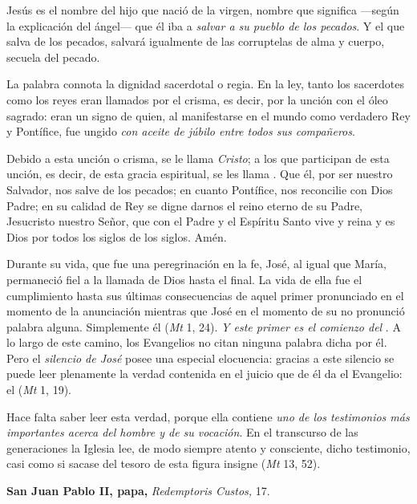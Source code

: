 \begin{body}
\begin{body}
Jesús es el nombre del hijo que nació de la virgen, nombre que significa ---según la explicación del ángel--- que él iba a \emph{salvar a su pueblo de los pecados}. Y el que salva de los pecados, salvará igualmente de las corruptelas de alma y cuerpo, secuela del pecado.

La palabra  connota la dignidad sacerdotal o regia. En la ley, tanto los sacerdotes como los reyes eran llamados  por el crisma, es decir, por la unción con el óleo sagrado: eran un signo de quien, al manifestarse en el mundo como verdadero Rey y Pontífice, fue ungido \emph{con aceite de júbilo entre todos sus compañeros}.

Debido a esta unción o crisma, se le llama \emph{Cristo}; a los que participan de esta unción, es decir, de esta gracia espiritual, se les llama . Que él, por ser nuestro Salvador, nos salve de los pecados; en cuanto Pontífice, nos reconcilie con Dios Padre; en su calidad de Rey se digne darnos el reino eterno de su Padre, Jesucristo nuestro Señor, que con el Padre y el Espíritu Santo vive y reina y es Dios por todos los siglos de los siglos. Amén.

Durante su vida, que fue una peregrinación en la fe, José, al igual que María, permaneció fiel a la llamada de Dios hasta el final. La vida de ella fue el cumplimiento hasta sus últimas consecuencias de aquel primer  pronunciado en el momento de la anunciación mientras que José en el momento de su  no pronunció palabra alguna. Simplemente él  (\emph{Mt} 1, 24). \emph{Y este primer  es el comienzo del }. A lo largo de este camino, los Evangelios no citan ninguna palabra dicha por él. Pero el \emph{silencio de José} posee una especial elocuencia: gracias a este silencio se puede leer plenamente la verdad contenida en el juicio que de él da el Evangelio: el  (\emph{Mt} 1, 19).

Hace falta saber leer esta verdad, porque ella contiene \emph{uno de los testimonios más importantes acerca del hombre y de su vocación}. En el transcurso de las generaciones la Iglesia lee, de modo siempre atento y consciente, dicho testimonio, casi como si sacase del tesoro de esta figura insigne  (\emph{Mt} 13, 52).

\textbf{San Juan Pablo II, papa,} \emph{Redemptoris Custos,} 17.




\end{body}
\end{body}
